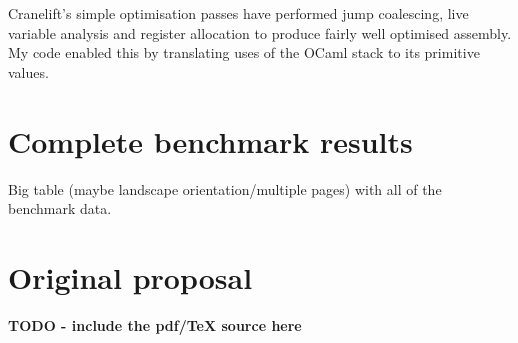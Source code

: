 Cranelift's simple optimisation passes have performed jump coalescing, live variable analysis and
register allocation
to produce fairly well optimised assembly. My code enabled this by translating uses of the OCaml
stack to its primitive values.

\chapter{Complete benchmark results}

Big table (maybe landscape orientation/multiple pages) with all of the benchmark data.

\chapter{Original proposal}

\textbf{TODO - include the pdf/TeX source here}